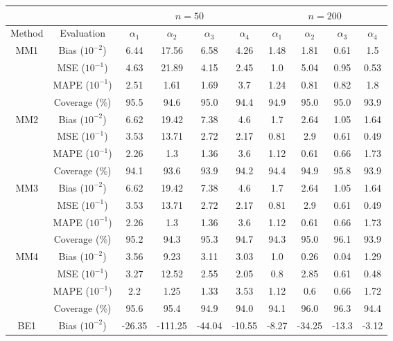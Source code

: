 \begin{table}[htbp]
\centering
\begin{tabular}{c|c|cccc|cccc}
                     &            & \multicolumn{4}{c|}{$n=50$}                       & \multicolumn{4}{c}{$n=200$}                      \\ \hline
Method               & Evaluation & $\alpha_1$ & $\alpha_2$ & $\alpha_3$ & $\alpha_4$ & $\alpha_1$ & $\alpha_2$ & $\alpha_3$ & $\alpha_4$ \\ \hline
\multirow{4}{*}{MM1}& Bias ($10^{-2}$)  & 6.44 & 17.56 & 6.58 & 4.26 & 1.48 & 1.81 & 0.61 & 1.5 \\ 
& MSE ($10^{-1}$)  & 4.63 & 21.89 & 4.15 & 2.45 & 1.0 & 5.04 & 0.95 & 0.53 \\ 
& MAPE ($10^{-1}$)  & 2.51 & 1.61 & 1.69 & 3.7 & 1.24 & 0.81 & 0.82 & 1.8 \\ 
& Coverage (\%)  & 95.5 & 94.6 & 95.0 & 94.4 & 94.9 & 95.0 & 95.0 & 93.9 \\ 
\hline 
\multirow{4}{*}{MM2}& Bias ($10^{-2}$)  & 6.62 & 19.42 & 7.38 & 4.6 & 1.7 & 2.64 & 1.05 & 1.64 \\ 
& MSE ($10^{-1}$)  & 3.53 & 13.71 & 2.72 & 2.17 & 0.81 & 2.9 & 0.61 & 0.49 \\ 
& MAPE ($10^{-1}$)  & 2.26 & 1.3 & 1.36 & 3.6 & 1.12 & 0.61 & 0.66 & 1.73 \\ 
& Coverage (\%)  & 94.1 & 93.6 & 93.9 & 94.2 & 94.4 & 94.9 & 95.8 & 93.9 \\ 
\hline 
\multirow{4}{*}{MM3}& Bias ($10^{-2}$)  & 6.62 & 19.42 & 7.38 & 4.6 & 1.7 & 2.64 & 1.05 & 1.64 \\ 
& MSE ($10^{-1}$)  & 3.53 & 13.71 & 2.72 & 2.17 & 0.81 & 2.9 & 0.61 & 0.49 \\ 
& MAPE ($10^{-1}$)  & 2.26 & 1.3 & 1.36 & 3.6 & 1.12 & 0.61 & 0.66 & 1.73 \\ 
& Coverage (\%)  & 95.2 & 94.3 & 95.3 & 94.7 & 94.3 & 95.0 & 96.1 & 93.9 \\ 
\hline 
\multirow{4}{*}{MM4}& Bias ($10^{-2}$)  & 3.56 & 9.23 & 3.11 & 3.03 & 1.0 & 0.26 & 0.04 & 1.29 \\ 
& MSE ($10^{-1}$)  & 3.27 & 12.52 & 2.55 & 2.05 & 0.8 & 2.85 & 0.61 & 0.48 \\ 
& MAPE ($10^{-1}$)  & 2.2 & 1.25 & 1.33 & 3.53 & 1.12 & 0.6 & 0.66 & 1.72 \\ 
& Coverage (\%)  & 95.6 & 95.4 & 94.9 & 94.0 & 94.1 & 96.0 & 96.3 & 94.4 \\ 
\hline 
\multirow{4}{*}{BE1}& Bias ($10^{-2}$)  & -26.35 & -111.25 & -44.04 & -10.55 & -8.27 & -34.25 & -13.3 & -3.12 \\ 

\end{tabular}
\end{table}
